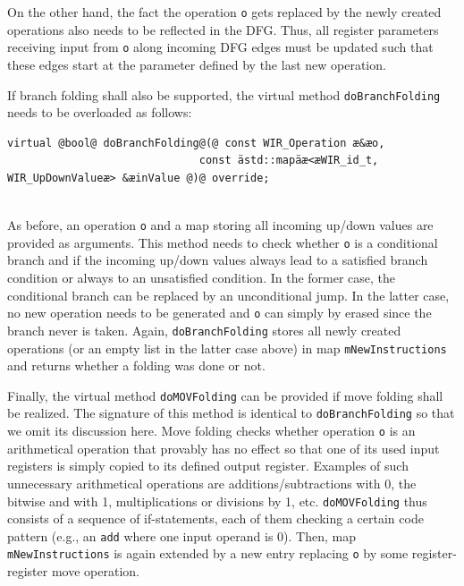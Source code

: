 On the other hand, the fact the operation \texttt{o} gets replaced by the newly created operations also needs to be reflected in the \gls{DFG}.
Thus, all register parameters receiving input from \texttt{o} along incoming \gls{DFG} edges must be updated such that these edges start at the parameter defined by the last new operation.

If branch folding shall also be supported, the virtual method \texttt{doBranchFolding} needs to be overloaded as follows: \\
\begin{lstlisting}[style=code,float=!ht,aboveskip=-0.8 \baselineskip,belowskip=-0.8 \baselineskip]
virtual @bool@ doBranchFolding@(@ const WIR_Operation æ&æo,
                              const ästd::mapäæ<æWIR_id_t, WIR_UpDownValueæ> &æinValue @)@ override;
\end{lstlisting}
\\
As before, an operation \texttt{o} and a map storing all incoming up/down values are provided as arguments.
This method needs to check whether \texttt{o} is a conditional branch and if the incoming up/down values always lead to a satisfied branch condition or always to an unsatisfied condition.
In the former case, the conditional branch can be replaced by an unconditional jump.
In the latter case, no new operation needs to be generated and \texttt{o} can simply by erased since the branch never is taken.
Again, \texttt{doBranchFolding} stores all newly created operations (or an empty list in the latter case above) in map \texttt{mNewInstructions} and returns whether a folding was done or not.

Finally, the virtual method \texttt{doMOVFolding} can be provided if move folding shall be realized.
The signature of this method is identical to \texttt{doBranchFolding} so that we omit its discussion here.
Move folding checks whether operation \texttt{o} is an arithmetical operation that provably has no effect so that one of its used input registers is simply copied to its defined output register.
Examples of such unnecessary arithmetical operations are additions/subtractions with 0, the bitwise and with 1, multiplications or divisions by 1, etc.
\texttt{doMOVFolding} thus consists of a sequence of if-statements, each of them checking a certain code pattern (e.g., an \texttt{add} where one input operand is 0).
Then, map \texttt{mNewInstructions} is again extended by a new entry replacing \texttt{o} by some register-register move operation.


